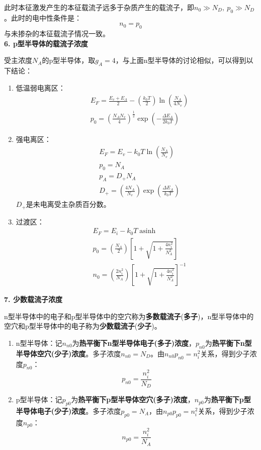 此时本征激发产生的本征载流子远多于杂质产生的载流子，即$n_0\gg N_D,\ p_0\gg N_D$。此时的电中性条件是：
\begin{equation}
    n_0=p_0
\end{equation}
与未掺杂的本征载流子情况一致。\vspace{1ex}\\
\textbf{6. p型半导体的载流子浓度}\vspace{1ex}

受主浓度$N_A$的p型半导体，取$g_A=4$，与上面n型半导体的讨论相似，可以得到以下结论：
\begin{enumerate}
    \item 低温弱电离区：
    \begin{align}
        &E_F=\frac{E_v+E_A}{2}-\left(\frac{k_0T}{2}\right)\ln{\left(\frac{N_A}{4N_v}\right)}\\
        &p_0=\left(\frac{N_AN_v}{4}\right)^\frac{1}{2}\exp{\left(-\frac{\Delta E_A}{2k_0T}\right)}
    \end{align}
    \item 强电离区：
    \begin{align}
        &E_F=E_v-k_0T\ln{\left(\frac{N_A}{N_v}\right)}\\
        &p_0=N_A\\
        &p_A=D_+N_A\\
        &D_+=\left(\frac{4N_A}{N_v}\right)\exp{\left(\frac{\Delta E_A}{k_0T}\right)}
    \end{align}
    $D_+$是未电离受主杂质百分数。
    \item 过渡区：
    \begin{align}
        &E_F=E_i-k_0T\mathop{\mathrm{asinh}{\left(\frac{N_A}{2n_i}\right)}}\\
        &p_0=\left(\frac{N_A}{2}\right)\left[1+\sqrt{1+\frac{4n_i^2}{N_A^2}}\right]\\
        &n_0=\left(\frac{2n_i^2}{N_A}\right)\left[1+\sqrt{1+\frac{4n_i^2}{N_A^2}}\right]^{-1}
    \end{align}
\end{enumerate}
\textbf{7. 少数载流子浓度}\vspace{1ex}

n型半导体中的电子和p型半导体中的空穴称为\textbf{多数载流子}(\textbf{多子})，n型半导体中的空穴和p型半导体中的电子称为\textbf{少数载流子}(\textbf{少子})。
\begin{enumerate}[(1)]
    \item n型半导体：记$n_{n0}$为\textbf{热平衡下n型半导体电子(多子)浓度}，$p_{n0}$为\textbf{热平衡下n型半导体空穴(少子)浓度}。多子浓度$n_{n0}=N_D$。由$n_{n0}p_{n0}=n_i^2$关系，得到少子浓度$p_{n0}$：
    \begin{equation}
        p_{n0}=\frac{n_i^2}{N_D}
    \end{equation}
    \item p型半导体：记$p_{p0}$为\textbf{热平衡下p型半导体空穴(多子)浓度}，$n_{p0}$为\textbf{热平衡下p型半导体电子(少子)浓度}。多子浓度$p_{p0}=N_A$，由$n_{p0}p_{p0}=n_i^2$关系，得到少子浓度$n_{p0}$：
    \begin{equation}
        n_{p0}=\frac{n_i^2}{N_A}
    \end{equation}
\end{enumerate}

